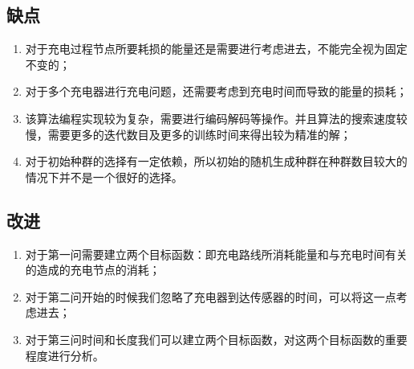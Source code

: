 \documentclass{article}
\begin{document}
\subsection{缺点}
\begin{enumerate}[(1)] 
    \item 对于充电过程节点所要耗损的能量还是需要进行考虑进去，不能完全视为固定不变的；
    \item 对于多个充电器进行充电问题，还需要考虑到充电时间而导致的能量的损耗；
    \item 该算法编程实现较为复杂，需要进行编码解码等操作。并且算法的搜索速度较慢，需要更多的迭代数目及更多的训练时间来得出较为精准的解；
    \item 对于初始种群的选择有一定依赖，所以初始的随机生成种群在种群数目较大的情况下并不是一个很好的选择。
\end{enumerate}

\subsection{改进}
\begin{enumerate}[(1)] 
    \item 对于第一问需要建立两个目标函数：即充电路线所消耗能量和与充电时间有关的造成的充电节点的消耗；
    \item 对于第二问开始的时候我们忽略了充电器到达传感器的时间，可以将这一点考虑进去；
    \item 对于第三问时间和长度我们可以建立两个目标函数，对这两个目标函数的重要程度进行分析。
\end{enumerate}
\newpage
\end{document}
